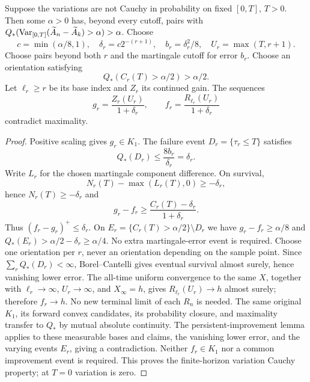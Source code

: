 \begin{proposition}
Suppose the variations are not Cauchy in probability on fixed $[0,T]$, $T>0$.
Then some $\alpha>0$ has, beyond every cutoff, pairs with
$Q_*(\operatorname{Var}_{[0,T]}(\widetilde A_n-\widetilde A_k)>\alpha)>\alpha$.
Choose
\[
 c=\min(\alpha/8,1),\quad\delta_r=c2^{-(r+1)},\quad
 b_r=\delta_r^2/8,\quad U_r=\max(T,r+1).
\]
Choose pairs beyond both $r$ and the martingale cutoff for error $b_r$.
Choose an orientation satisfying
\[Q_*(C_r(T)>\alpha/2)>\alpha/2.\]
Let $\ell_r\geq r$ be its
base index and $Z_r$ its continued gain. The sequences
\[
 g_r=\frac{Z_r(U_r)}{1+\delta_r},\qquad
 f_r=\frac{R_{\ell_r}(U_r)}{1+\delta_r}
\]
contradict maximality.
\end{proposition}
\begin{proof}
Positive scaling gives $g_r\in K_1$. The failure event $D_r=\{\tau_r\leq T\}$
satisfies
\[
 Q_*(D_r)\leq\frac{8b_r}{\delta_r}=\delta_r.
\]
Write $L_r$ for the chosen martingale component difference.
On survival,
\[
 N_r(T)-\max(L_r(T),0)\geq-\delta_r,
\]
hence $N_r(T)\geq-\delta_r$ and
\[
 g_r-f_r\geq\frac{C_r(T)-\delta_r}{1+\delta_r}.
\]
Thus $(f_r-g_r)^+\leq\delta_r$. On
$E_r=\{C_r(T)>\alpha/2\}\setminus D_r$ we have $g_r-f_r\geq\alpha/8$ and
$Q_*(E_r)>\alpha/2-\delta_r\geq\alpha/4$.
No extra martingale-error event is required. Choose one orientation per $r$,
never an orientation depending on the sample point.
Since $\sum_rQ_*(D_r)<\infty$, Borel--Cantelli gives eventual survival almost
surely, hence vanishing lower error. The all-time uniform convergence to the
same $X$, together with $\ell_r\to\infty$, $U_r\to\infty$, and $X_\infty=h$,
gives $R_{\ell_r}(U_r)\to h$ almost surely; therefore $f_r\to h$.
No new terminal limit of each $R_n$ is needed.
The same original $K_1$, its forward convex candidates, its probability
closure, and maximality transfer to $Q_*$ by mutual absolute continuity.
The persistent-improvement lemma applies to these measurable bases and claims,
the vanishing lower error, and the varying events $E_r$, giving a contradiction.
Neither $f_r\in K_1$ nor a common improvement event is required.
This proves the finite-horizon variation Cauchy property; at $T=0$ variation
is zero.
\end{proof}

